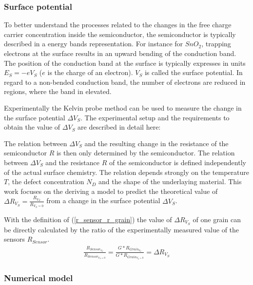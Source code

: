 \documentclass[11pt]{article}
\begin{document}
\hypertarget{surface-potential}{%
\subsubsection{Surface potential}\label{surface-potential}}

To better understand the processes related to the changes in the free
charge carrier concentration inside the semiconductor, the semiconductor
is typically described in a energy bands representation. For instance
for \(SnO_2\), trapping electrons at the surface results in an upward
bending of the conduction band. The position of the conduction band at
the surface is typically expresses in units \(E_S = -eV_S\) (\(e\) is
the charge of an electron). \(V_S\) is called the surface potential. In
regard to a non-bended conduction band, the number of electrons are
reduced in regions, where the band in elevated.

Experimentally the Kelvin probe method can be used to measure the change
in the surface potential \(\Delta V_S\). The experimental setup and the
requirements to obtain the value of \(\Delta V_S\) are described in
detail here: \cite{Oprea2009a}

The relation between \(\Delta V_S\) and the resulting change in the
resistance of the semiconductor \(R\) is then only determined by the
semiconductor. The relation between \(\Delta V_S\) and the resistance
\(R\) of the semiconductor is defined independently of the actual
surface chemistry. The relation depends strongly on the temperature
\(T\), the defect concentration \(N_D\) and the shape of the underlaying
material. This work focuses on the deriving a model to predict the
theoretical value of \(\Delta R_{V_S} = \frac {R_{V_S}} {R_{V_S=0}}\)
from a change in the surface potential \(\Delta V_S\).

With the definition of (\ref{r_sensor_r_grain}) the value of
\(\Delta R_{V_S}\) of one grain can be directly calculated by the ratio
of the experimentally measured value of the sensors \(R_{Sensor}\).
\begin{align}
\frac{R_{Sensor_{V_S}}}{R_{Sensor_{V_S=0}}}  = \frac{G*R_{Grain_{V_S}}}{G*R_{Grain_{V_S=0}}} = \Delta R_{V_S}
\end{align}

\hypertarget{numerical-model}{%
\subsubsection{Numerical model}\label{numerical-model}}
\end{document}
